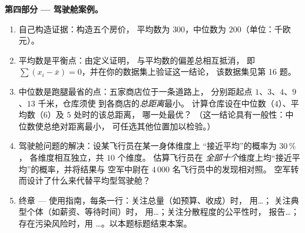 \begin{problem}
\medskip
\noindent\textbf{第四部分 --- 驾驶舱案例。}
\begin{enumerate}[resume]
  \item 自己构造证据：构造五个房价，
        平均数为 $300$，中位数为 $200$（单位：千欧元）。
  \item 平均数是平衡点：由定义证明，
        与平均数的偏差总相互抵消，
        即 $\sum (x_i - \bar x) = 0$，并在你的数据集上验证这一结论，
        该数据集见第 16 题。
  \item 中位数是跑腿最省的点：五家商店位于一条道路上，
        分别距起点 $1$、$3$、$4$、$9$、$13$ 千米，仓库须使
        到各商店的\emph{总距离}最小。
        计算仓库设在中位数（$4$）、平均数（$6$）及 $5$ 处时的该总距离，
        哪一处最优？
        （这一结论具有一般性：中位数使总绝对距离最小，
        可任选其他位置加以检验。）
  \item 驾驶舱问题的解决：设某飞行员在某一身体维度上
        “接近平均”的概率为 $30\,\%$，
        各维度相互独立，共 $10$ 个维度。
        估算飞行员在
        \emph{全部十个}维度上均“接近平均”的概率，并将结果与
        空军中尉在 $4\,000$ 名飞行员中的发现相对照。
        空军转而设计了什么来代替平均型驾驶舱？
  \item 终章 --- 使用指南，每条一行：关注总量（如预算、收成）时，
        用\dots；
        关注典型个体（如薪资、等待时间）时，
        用\dots；关注分散程度的公平性时，
        报告\dots；存在污染风险时，用
        \dots。以本题标题结束本案。
\end{enumerate}
\end{problem}
